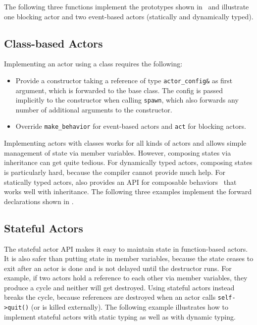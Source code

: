 The following three functions implement the prototypes shown in~ and illustrate one blocking actor and two event-based actors (statically and dynamically typed).

\clearpage


\clearpage
\subsection{Class-based Actors}
\label{class-based}

Implementing an actor using a class requires the following:
\begin{itemize}
\item Provide a constructor taking a reference of type \lstinline^actor_config&^ as first argument, which is forwarded to the base class. The config is passed implicitly to the constructor when calling \lstinline^spawn^, which also forwards any number of additional arguments to the constructor.
\item Override \lstinline^make_behavior^ for event-based actors and \lstinline^act^ for blocking actors.
\end{itemize}

Implementing actors with classes works for all kinds of actors and allows simple management of state via member variables. However, composing states via inheritance can get quite tedious. For dynamically typed actors, composing states is particularly hard, because the compiler cannot provide much help. For statically typed actors, \lib also provides an API for composable behaviors~ that works well with inheritance. The following three examples implement the forward declarations shown in .



\clearpage
\subsection{Stateful Actors}
\label{stateful-actor}

The stateful actor API makes it easy to maintain state in function-based actors. It is also safer than putting state in member variables, because the state ceases to exit after an actor is done and is not delayed until the destructor runs. For example, if two actors hold a reference to each other via member variables, they produce a cycle and neither will get destroyed. Using stateful actors instead breaks the cycle, because references are destroyed when an actor calls \lstinline^self->quit()^ (or is killed externally). The following example illustrates how to implement stateful actors with static typing as well as with dynamic typing.


